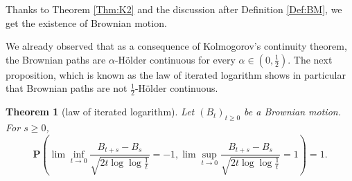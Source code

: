 \documentclass[twoside, 12pt]{book}
\numberwithin{equation}{chapter}
\newtheorem{theorem}{Theorem}[section]
\def\bP{{\mathbf P}}
\def\ge{\geqslant}
\begin{document}
	Thanks to Theorem \ref{Thm:K2} and the discussion after Definition \ref{Def:BM}, we get the existence of Brownian motion. 
	
	We already observed that as a consequence of Kolmogorov’s continuity theorem, the Brownian paths are $\alpha$-H\"older continuous for every $\alpha \in \left(0,\frac{1}{2}\right)$. The next proposition, which is known as the law of iterated logarithm shows in particular that Brownian paths are not $\frac{1}{2}$-H\"older continuous.
	\begin{theorem}[law of iterated logarithm]
		Let $(B_t)_{t\ge 0}$ be a Brownian motion. For $s \ge 0$,
		\[
		\bP \left( \lim \inf_{t \rightarrow 0} \frac{B_{t+s}-B_s}{\sqrt{2t \log  \log  \frac{1}{t}}} =-1 , \lim \sup_{t \rightarrow 0} \frac{B_{t+s}-B_s}{\sqrt{2t\log  \log  \frac{1}{t}}} =1 \right)=1.  
		\]
	\end{theorem}
\end{document}
